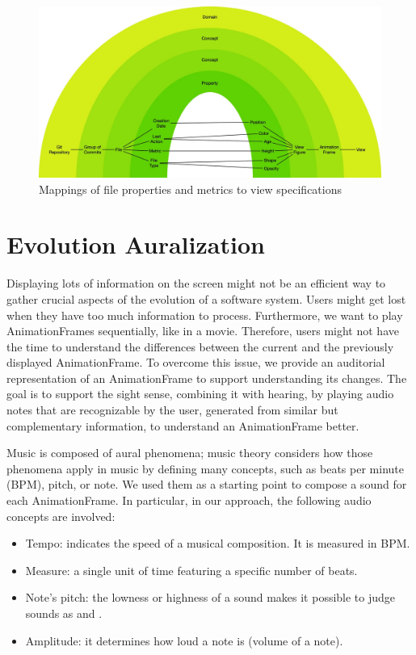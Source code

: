 \begin{figure}
    \center
    \includegraphics[width=\textwidth]{ApproachMapping.jpg}
    \caption{Mappings of file properties and metrics to view specifications}
    \label{fig:ApproachMapping}
\end{figure}



\section{Evolution Auralization}
\label{sec:audioApproach}
Displaying lots of information on the screen might not be an efficient way to gather crucial aspects of the evolution of a software system. Users might get lost when they have too much information to process. Furthermore, we want to play AnimationFrames sequentially, like in a movie. Therefore, users might not have the time to understand the differences between the current and the previously displayed AnimationFrame. To overcome this issue, we provide an auditorial representation of an AnimationFrame to support understanding its changes. The goal is to support the sight sense, combining it with hearing, by playing audio notes that are recognizable by the user, generated from similar but complementary information, to understand an AnimationFrame better. 

Music is composed of aural phenomena; music theory considers how those phenomena apply in music by defining many concepts, such as beats per minute (BPM), pitch, or note.
We used them as a starting point to compose a sound for each AnimationFrame. In particular, in our approach, the following audio concepts are involved:
\begin{itemize}
    \item Tempo: indicates the speed of a musical composition. It is measured in BPM. 
    \item Measure: a single unit of time featuring a specific number of beats. 
	\item Note's pitch:  the lowness or highness of a sound makes it possible to judge sounds as  and .
	\item Amplitude: it determines how loud a note is (volume of a note).
\end{itemize}

